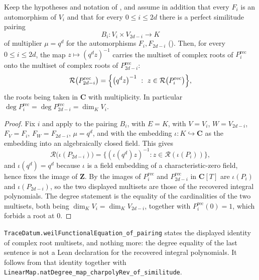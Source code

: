 \begin{theorem}
\label{thm:zla-functional-equation}
\leanok
Keep the hypotheses and notation of , and
assume in addition that every $F_i$ is an automorphism of $V_i$ and that for
every $0\leq i\leq2d$ there is a perfect similitude pairing
\[
  B_i:V_i\times V_{2d-i}\longrightarrow K
\]
of multiplier $\mu=q^d$ for the automorphisms $F_i,F_{2d-i}$
().  Then, for every $0\leq i\leq2d$, the map
$z\mapsto(q^dz)^{-1}$ carries the multiset of complex roots of
$P_i^{\mathrm{rec}}$ onto the multiset of complex roots of
$P_{2d-i}^{\mathrm{rec}}$:
\[
  \mathcal R\bigl(P_{2d-i}^{\mathrm{rec}}\bigr)
  =\Bigl\{\bigl(q^dz\bigr)^{-1}
  \ :\ z\in\mathcal R\bigl(P_i^{\mathrm{rec}}\bigr)\Bigr\},
\]
the roots being taken in $\mathbf C$ with multiplicity.  In particular
$\deg P_i^{\mathrm{rec}}=\deg P_{2d-i}^{\mathrm{rec}}=\dim_KV_i$.
\end{theorem}
\begin{proof}
\leanok
Fix $i$ and apply  to the pairing
$B_i$, with $E=K$, with $V=V_i$, $W=V_{2d-i}$, $F_V=F_i$, $F_W=F_{2d-i}$,
$\mu=q^d$, and with the embedding $\iota:K\hookrightarrow\mathbf C$ as the
embedding into an algebraically closed field.  This gives
\[
  \mathcal R\bigl(\iota(P_{2d-i})\bigr)
  =\bigl\{(\iota(q^d)z)^{-1}:z\in\mathcal R(\iota(P_i))\bigr\},
\]
and $\iota(q^d)=q^d$ because $\iota$ is a field embedding of a
characteristic-zero field, hence fixes the image of $\mathbf Z$.  By
 the images of $P_i^{\mathrm{rec}}$ and
$P_{2d-i}^{\mathrm{rec}}$ in $\mathbf C[T]$ are $\iota(P_i)$ and
$\iota(P_{2d-i})$, so the two displayed multisets are those of the recovered
integral polynomials.  The degree statement is the equality of the
cardinalities of the two multisets, both being $\dim_KV_i=\dim_KV_{2d-i}$,
together with $P_i^{\mathrm{rec}}(0)=1$, which forbids a root at $0$.
\end{proof}

\texttt{TraceDatum.weilFunctionalEquation\_of\_pairing} states the displayed
identity of complex root multisets, and nothing more: the degree equality of
the last sentence is not a Lean declaration for the recovered integral
polynomials.  It follows from that identity together with
\texttt{LinearMap.natDegree\_map\_charpolyRev\_of\_similitude}.

